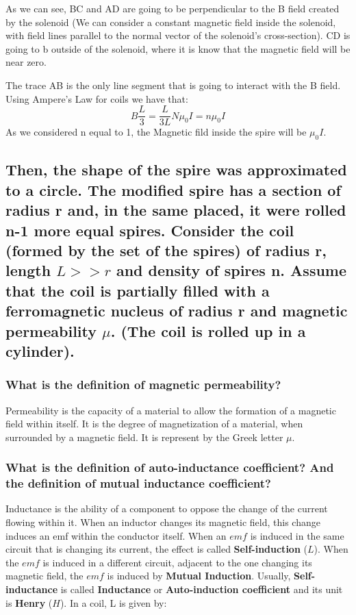 \documentclass[a4paper,12pt]{article}
\begin{document}
As we can see, BC and AD are going to be perpendicular to the B field created by the solenoid (We can consider a constant magnetic field inside the solenoid, with field lines parallel to the normal vector of the solenoid's cross-section). CD is going to b outside of the solenoid, where it is know that the magnetic field will be near zero.


The trace AB is the only line segment that is going to interact with the B field. Using Ampere's Law for coils we have that:
\begin{equation}
B\frac{L}{3} = \frac{L}{3L}N\mu _0 I = n\mu_0I
\end{equation}
As we considered n equal to 1, the Magnetic fild inside the spire will be $\mu_0I$.

\subsection{Then, the shape of the spire was approximated to a circle. The modified spire has a section of radius r and, in the same placed, it were rolled n-1 more equal spires. Consider the coil (formed by the set of the spires) of radius r, length $ L >> r$ and density of spires n. Assume that the coil is partially filled with a ferromagnetic nucleus of radius r and magnetic permeability $\mu$. (The coil is rolled up in a cylinder).}

\subsubsection{What is the definition of magnetic permeability?}
\hspace{1cm} Permeability is the capacity of a material to allow the formation of a magnetic field within itself. It is the degree of magnetization of a material, when surrounded by a magnetic field.
It is represent by the Greek letter $\mu$.

\subsubsection{What is the definition of auto-inductance coefficient? And the definition of mutual inductance coefficient? } 

\hspace{1cm} Inductance is the ability of a component to oppose the change of the current flowing within it. When an inductor changes its magnetic field, this change induces an emf within the conductor itself. When an $emf$ is induced in the same circuit that is changing its current, the effect is called \textbf{Self-induction} ($L$). When the $emf$ is induced in a different circuit, adjacent to the one changing its magnetic field, the $emf$ is induced by \textbf{Mutual Induction}. Usually, \textbf{Self-inductance} is called \textbf{Inductance} or \textbf{Auto-induction  coefficient} and its unit is \textbf{Henry} ($H$). In a coil, L is given by: 
\end{document}
